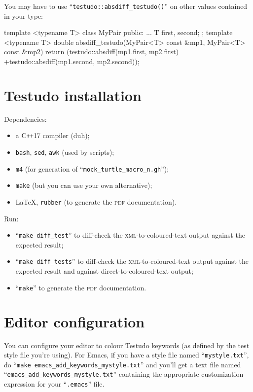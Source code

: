 \documentclass[twoside, a4paper, article]{memoir}
\newcommand*\Cpp{C\texttt{++}}
\begin{document}
You may have to use ``\texttt{testudo::absdiff\_testudo()}'' on other values
contained in your type:
\begin{cpplisting}
template <typename T>
class MyPair {
public:
  ...
  T first, second;
};
template <typename T>
double absdiff_testudo(MyPair<T> const &mp1,
                       MyPair<T> const &mp2) {
  return (testudo::absdiff(mp1.first, mp2.first)
          +testudo::absdiff(mp1.second, mp2.second));
}
\end{cpplisting}


\cleartooddpage

\appendices

\chapter{Testudo installation}
\label{cha:testudo-installation}

Dependencies:
\begin{itemize}
\item a \Cpp{}17 compiler (duh);
\item \texttt{bash}, \texttt{sed}, \texttt{awk} (used by scripts);
\item \texttt{m4} (for generation of ``\texttt{mock\_turtle\_macro\_n.gh}'');
\item \texttt{make} (but you can use your own alternative);
\item \LaTeX{}, \texttt{rubber} (to generate the \textsc{pdf} documentation).
\end{itemize}

Run:
\begin{itemize}
\item ``\texttt{make diff\_test}'' to diff-check the
  \textsc{xml}-to-coloured-text output against the expected result;
\item ``\texttt{make diff\_tests}'' to diff-check the
  \textsc{xml}-to-coloured-text output against the expected result and against
  direct-to-coloured-text output;
\item ``\texttt{make}'' to generate the \textsc{pdf} documentation.
\end{itemize}


\chapter{Editor configuration}
\label{cha:editor-configuration}

You can configure your editor to colour Testudo keywords (as defined by the
test style file you're using).  For Emacs, if you have a style file named
``\texttt{mystyle.txt}'', do ``\texttt{make
  emacs\_add\_keywords\_mystyle.txt}'' and you'll get a text file named
``\texttt{emacs\_add\_keywords\_mystyle.txt}'' containing the appropriate
customization expression for your ``\texttt{.emacs}'' file.
\end{document}
